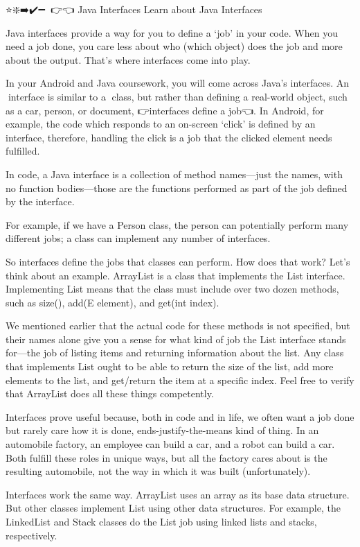 ⭐❇️➡️✔️➖🔗💎👉👈
Java Interfaces
        Learn about Java Interfaces
        
        Java interfaces provide a way for you to define a ‘job’ in your code. When you need a job done, you care less about who (which object) does the job and more about the output. That’s where interfaces come into play.

        In your Android and Java coursework, you will come across Java’s interfaces. An 💎interface is similar to a 💎class, but rather than defining a real-world object, such as a car, person, or document, 👉interfaces define a job👈. In Android, for example, the code which responds to an on-screen ‘click’ is defined by an interface, therefore, handling the click is a job that the clicked element needs fulfilled.

        In code, a Java interface is a collection of method names—just the names, with no function bodies—those are the functions performed as part of the job defined by the interface.

        For example, if we have a Person class, the person can potentially perform many different jobs; a class can implement any number of interfaces.

        So interfaces define the jobs that classes can perform. How does that work? Let’s think about an example. ArrayList is a class that implements the List interface. Implementing List means that the class must include over two dozen methods, such as size(), add(E element), and get(int index).

        We mentioned earlier that the actual code for these methods is not specified, but their names alone give you a sense for what kind of job the List interface stands for—the job of listing items and returning information about the list. Any class that implements List ought to be able to return the size of the list, add more elements to the list, and get/return the item at a specific index. Feel free to verify that ArrayList does all these things competently.

        Interfaces prove useful because, both in code and in life, we often want a job done but rarely care how it is done, ends-justify-the-means kind of thing. In an automobile factory, an employee can build a car, and a robot can build a car. Both fulfill these roles in unique ways, but all the factory cares about is the resulting automobile, not the way in which it was built (unfortunately).

        Interfaces work the same way. ArrayList uses an array as its base data structure. But other classes implement List using other data structures. For example, the LinkedList and Stack classes do the List job using linked lists and stacks, respectively.

